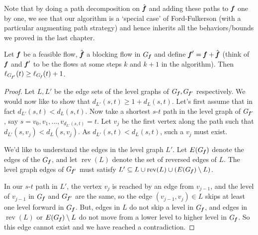 Note that by doing a path decomposition on $\hat{\boldsymbol{\mathit{f}}}$ and adding these paths to $\boldsymbol{\mathit{f}}$ one by one, we see that
our algorithm is a `special case' of Ford-Fulkerson (with a particular augmenting path strategy) and hence
inherits all the behaviors/bounds we proved in the last chapter.

\begin{lemma}
  Let $\boldsymbol{\mathit{f}}$ be a feasible flow, $\hat{\boldsymbol{\mathit{f}}}$ a blocking flow in $G_{\boldsymbol{\mathit{f}}}$ and define $\boldsymbol{\mathit{f}}' = \boldsymbol{\mathit{f}}+\hat{\boldsymbol{\mathit{f}}}$ (think
  of $\boldsymbol{\mathit{f}}$ and $\boldsymbol{\mathit{f}}'$ to be the flows at some steps $k$ and $k+1$ in the algorithm). Then
  $\ell_{G_{\boldsymbol{\mathit{f}}'}}(t) \geq \ell_{G_{\boldsymbol{\mathit{f}}}}(t) + 1$.
\end{lemma}
\begin{proof}
  Let $L, L'$ be the edge sets of the level graphs of $G_{\boldsymbol{\mathit{f}}}, G_{\boldsymbol{\mathit{f}}'}$
  respectively.
  We would now like to show that $d_{L'}(s, t) \geq 1 + d_L(s, t)$. Let's first assume that in fact
  $d_{L'}(s, t) < d_L(s, t)$. Now take a shortest $s$-$t$ path in the level graph of
  $G_{\boldsymbol{\mathit{f}}'}$, say $s=v_0, v_1, \dots, v_{d_{L'}(s, t)} =  t$.
  Let $v_j$ be the first vertex along the path such that
  $d_{L'}(s, v_j) < d_L(s, v_j)$.
  As $d_{L'}(s, t) < d_L(s, t)$, such a $v_j$ must exist.

  We'd like to understand the edges in the level
  graph $L'$.
  Let $E(G_{\boldsymbol{\mathit{f}}})$ denote the edges of the $G_{\boldsymbol{\mathit{f}}}$,
  and let $\operatorname{rev}(L)$ denote the set of
  reversed edges of $L$.
  The level graph edges of $G_{\boldsymbol{\mathit{f}}'}$ must satisfy
  $L' \subseteq L \cup
  \operatorname{rev}(L) \cup (E(G_{\boldsymbol{\mathit{f}}}) \setminus
  L)$.

  In our $s$-$t$ path in $L'$, the vertex $v_j$ is reached by an edge from $v_{j-1}$,
  and the level of $v_{j-1}$ in $G_{\boldsymbol{\mathit{f}}}$ and $G_{\boldsymbol{\mathit{f}}'}$
  are the same, so the edge $(v_{j-1},v_j) \in L$ skips
  at least one level forward  in $G_{\boldsymbol{\mathit{f}}}$.
  But, edges in $L$ do not skip a level in
  $G_{\boldsymbol{\mathit{f}}}$, and edges in
  $\operatorname{rev}(L)$ or
  $E(G_{\boldsymbol{\mathit{f}}}) \setminus L$ do not move from a lower level to higher
  level in $G_{\boldsymbol{\mathit{f}}}$.
  So this edge cannot exist and we have reached a contradiction.


\end{proof}
